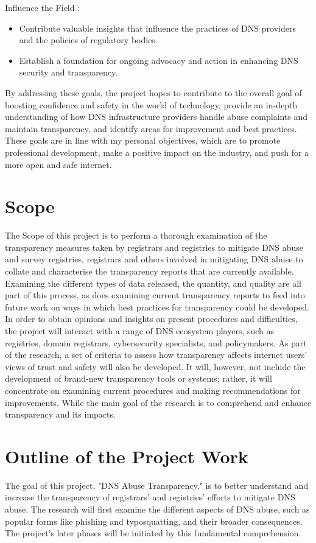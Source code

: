 Influence the Field : 

\begin{itemize}
  \item Contribute valuable insights that influence the practices of DNS providers and the policies of regulatory bodies.
  \item Establish a foundation for ongoing advocacy and action in enhancing DNS security and transparency.
\end{itemize}

By addressing these goals, the project hopes to contribute to the overall goal of boosting confidence and safety in the world of technology, provide an in-depth understanding of how DNS infrastructure providers handle abuse complaints and maintain transparency, and identify areas for improvement and best practices. These goals are in line with my personal objectives, which are to promote professional development, make a positive impact on the industry, and push for a more open and safe internet.


\section{Scope}	
The Scope of this project is to perform a thorough examination of the transparency measures taken by registrars and registries to mitigate DNS abuse and survey registries, registrars and others involved in mitigating DNS abuse to collate and characterise the transparency reports that are currently available. Examining the different types of data released, the quantity, and quality are all part of this process, as does examining current transparency reports to feed into future work on ways in which best practices for transparency could be developed. In order to obtain opinions and insights on present procedures and difficulties, the project will interact with a range of DNS ecosystem players, such as registries, domain registrars, cybersecurity specialists, and policymakers. As part of the research, a set of criteria to assess how transparency affects internet users' views of trust and safety will also be developed. It will, however, not include the development of brand-new transparency tools or systems; rather, it will concentrate on examining current procedures and making recommendations for improvements. While the main goal of the research is to comprehend and enhance transparency and its impacts. 

\section{ Outline of the Project Work} 
The goal of this project, "DNS Abuse Transparency," is to better understand and increase the transparency of registrars' and registries' efforts to mitigate DNS abuse. The research will first examine the different aspects of DNS abuse, such as popular forms like phishing and typosquatting, and their broader consequences. The project's later phases will be initiated by this fundamental comprehension.

